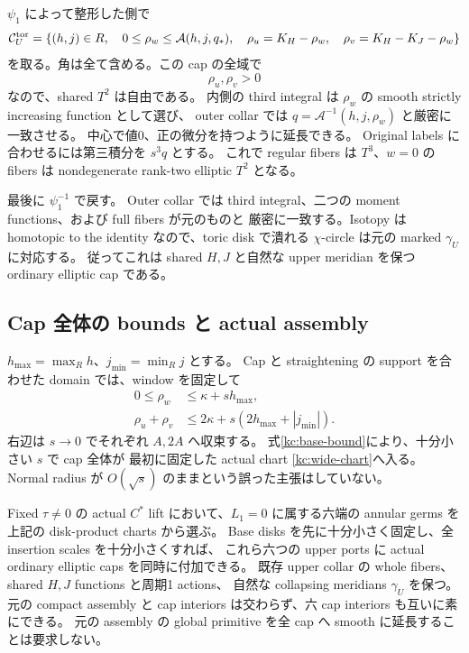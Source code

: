 $\psi_1$ によって整形した側で
\begin{equation}\label{kc:toric-cap}
 \mathcal C^{\rm tor}_U=
 \left\{(h,j)\in R,\quad
 0\le\rho_w\le\mathcal A(h,j,q_*),\quad
 \rho_u=K_H-\rho_w,\quad\rho_v=K_H-K_J-\rho_w\right\}
\end{equation}
を取る。角は全て含める。この cap の全域で
\[
 \rho_u,\rho_v>0
\]
なので、shared $T^2$ は自由である。
内側の third integral は $\rho_w$ の smooth strictly increasing function として選び、
outer collar では $q=\mathcal A^{-1}(h,j,\rho_w)$ と厳密に一致させる。
中心で値0、正の微分を持つように延長できる。
Original labels に合わせるには第三積分を $s^3q$ とする。
これで regular fibers は $T^3$、$w=0$ の fibers は nondegenerate rank-two elliptic $T^2$ となる。

最後に $\psi_1^{-1}$ で戻す。
Outer collar では third integral、二つの moment functions、および full fibers が元のものと
厳密に一致する。Isotopy は homotopic to the identity なので、toric disk で潰れる
$\chi$-circle は元の marked $\gamma_U$ に対応する。
従ってこれは shared $H,J$ と自然な upper meridian を保つ ordinary elliptic cap である。

\subsection{Cap 全体の bounds と actual assembly}

$h_{\max}=\max_Rh$、$j_{\min}=\min_Rj$ とする。
Cap と straightening の support を合わせた domain では、window を固定して
\begin{align}
 0\le\rho_w&\le\kappa+sh_{\max},\label{kc:cap-bound-w}\\
 \rho_u+\rho_v&\le2\kappa+s(2h_{\max}+|j_{\min}|).
 \label{kc:cap-bound-normal}
\end{align}
右辺は $s\to0$ でそれぞれ $A,2A$ へ収束する。
式\eqref{kc:base-bound}により、十分小さい $s$ で cap 全体が
最初に固定した actual chart \eqref{kc:wide-chart}へ入る。
Normal radius が $O(\sqrt s)$ のままという誤った主張はしていない。

\begin{theorem}\label{kc:six-caps}
Fixed $\tau\ne0$ の actual $C^*$ lift において、$L_1=0$ に属する六端の annular germs を
上記の disk-product charts から選ぶ。
Base disks を先に十分小さく固定し、全 insertion scales を十分小さくすれば、
これら六つの upper ports に actual ordinary elliptic caps を同時に付加できる。
既存 upper collar の whole fibers、shared $H,J$ functions と周期1 actions、
自然な collapsing meridians $\gamma_U$ を保つ。
元の compact assembly と cap interiors は交わらず、六 cap interiors も互いに素にできる。
元の assembly の global primitive を全 cap へ smooth に延長することは要求しない。
\end{theorem}


